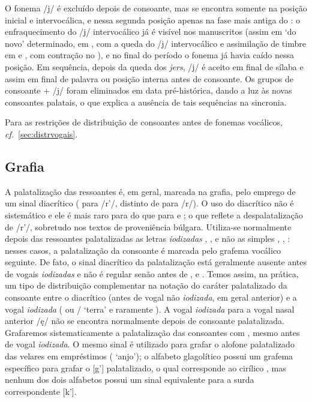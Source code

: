 O fonema /j/ é excluído depois de consoante, mas se encontra somente na posição
inicial e intervocálica, e nessa segunda posição apenas na fase mais antiga do
: o enfraquecimento do /j/ intervocálico já é visível nos
manuscritos (assim em   `do novo'
 determinado, em ,  com a queda
do /j/ intervocálico e assimilação de timbre em  e
,  com contração no ), e
no final do período o fonema já havia caído nessa posição.
Em sequência, depois da queda dos \emph{jers}, /j/ é aceito em final de sílaba e
assim em final de palavra ou posição interna antes de consoante.
Os grupos de consoante + /j/ foram eliminados em data pré-histórica, dando a luz
às novas consoantes palatais, o que explica a ausência de tais sequências na
sincronia.

Para as restrições de distribuição de consoantes antes de fonemas vocálicos,
\emph{cf.}~\ref{sec:distrvogais}.

\subsection{Grafia}

A palatalização das ressoantes é, em geral, marcada na grafia, pelo emprego de
um sinal diacrítico  ( para /r'/,
distinto de  para /r/).
O uso do diacrítico não é sistemático e ele é mais raro para
 do que para  e
; o que reflete a despalatalização de /r'/, sobretudo nos
textos de proveniência búlgara.
Utiliza-se normalmente depois das ressoantes palatalizadas as letras
\emph{iodizadas} , ,
 e não as simples ,
, : nesses casos, a palatalização da
consoante é marcada pelo grafema vocálico seguinte.
De fato, o sinal diacrítico da palatalização está geralmente ausente antes de
vogais \emph{iodizadas} e não é regular senão antes de ,  e
.
Temos assim, na prática, um tipo de distribuição complementar na notação do
caráter palatalizado da consoante entre o diacrítico (antes de vogal não
\emph{iodizada}, em geral anterior) e a vogal \emph{iodizada} ( ou
\slash{} `terra'  e raramente
).
A vogal \emph{iodizada}  para a vogal nasal anterior /ę/ não se
encontra normalmente depois de consoante palatalizada.
Grafaremos sistematicamente a palatalização das consoantes com
, mesmo antes de vogal \emph{iodizada}.
O mesmo sinal é utilizado para grafar o alofone palatalizado das velares em
empréstimos ( `anjo'); o alfabeto
glagolítico possui um grafema específico para grafar o [g'] palatalizado, o qual
corresponde ao cirílico , mas nenhum dos dois alfabetos
possui um sinal equivalente para a surda correspondente [k'].

